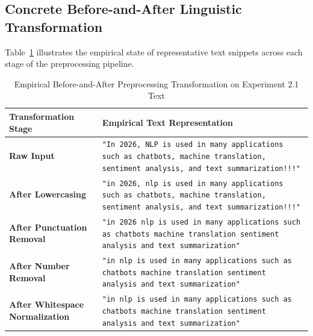\subsection{Concrete Before-and-After Linguistic Transformation}
Table~\ref{tab:exp2_before_after} illustrates the empirical state of representative text snippets across each stage of the preprocessing pipeline.
\begin{table}[H]
\centering
\small
\caption{Empirical Before-and-After Preprocessing Transformation on Experiment 2.1 Text}
\label{tab:exp2_before_after}
\begin{tabularx}{\textwidth}{lp{11.5cm}}
\toprule
\textbf{Transformation Stage} & \textbf{Empirical Text Representation} \\
\midrule
\textbf{Raw Input} & \texttt{"In 2026, NLP is used in many applications such as chatbots, machine translation, sentiment analysis, and text summarization!!!"} \\
\textbf{After Lowercasing} & \texttt{"in 2026, nlp is used in many applications such as chatbots, machine translation, sentiment analysis, and text summarization!!!"} \\
\textbf{After Punctuation Removal} & \texttt{"in 2026 nlp is used in many applications such as chatbots machine translation sentiment analysis and text summarization"} \\
\textbf{After Number Removal} & \texttt{"in  nlp is used in many applications such as chatbots machine translation sentiment analysis and text summarization"} \\
\textbf{After Whitespace Normalization} & \texttt{"in nlp is used in many applications such as chatbots machine translation sentiment analysis and text summarization"} \\
\bottomrule
\end{tabularx}
\end{table}

